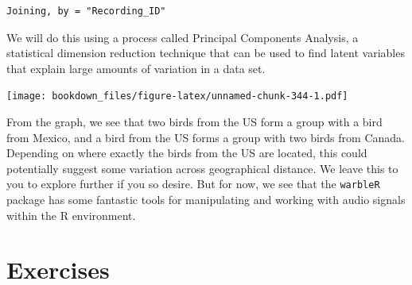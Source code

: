 \documentclass[]{krantz}
\makeatletter
\newenvironment{Shaded}{\begin{snugshade}}{\end{snugshade}}
\newcommand{\KeywordTok}[1]{\textcolor[rgb]{0.27,0.27,0.27}{\textbf{#1}}}
\newcommand{\DataTypeTok}[1]{\textcolor[rgb]{0.27,0.27,0.27}{#1}}
\newcommand{\DecValTok}[1]{\textcolor[rgb]{0.06,0.06,0.06}{#1}}
\newcommand{\StringTok}[1]{\textcolor[rgb]{0.5,0.5,0.5}{#1}}
\newcommand{\CommentTok}[1]{\textcolor[rgb]{0.37,0.37,0.37}{\textit{#1}}}
\newcommand{\OtherTok}[1]{\textcolor[rgb]{0.37,0.37,0.37}{#1}}
\newcommand{\OperatorTok}[1]{\textcolor[rgb]{0.43,0.43,0.43}{\textbf{#1}}}
\newcommand{\ErrorTok}[1]{\textcolor[rgb]{0.14,0.14,0.14}{\textbf{#1}}}
\newcommand{\NormalTok}[1]{#1}
\newenvironment{kframe}{%
\medskip{}
\setlength{\fboxsep}{.8em}
 \def\at@end@of@kframe{}%
 \ifinner\ifhmode%
  \def\at@end@of@kframe{\end{minipage}}%
  \begin{minipage}{\columnwidth}%
 \fi\fi%
 \def\FrameCommand##1{\hskip\@totalleftmargin \hskip-\fboxsep
 \colorbox{shadecolor}{##1}\hskip-\fboxsep
     \hskip-\linewidth \hskip-\@totalleftmargin \hskip\columnwidth}%
 \MakeFramed {\advance\hsize-\width
   \@totalleftmargin\z@ \linewidth\hsize
   \@setminipage}}%
 {\par\unskip\endMakeFramed%
 \at@end@of@kframe}
\renewenvironment{Shaded}{\begin{kframe}}{\end{kframe}}
\makeatother
\begin{document}
\begin{verbatim}
Joining, by = "Recording_ID"
\end{verbatim}

We will do this using a process called Principal Components Analysis, a
statistical dimension reduction technique that can be used to find
latent variables that explain large amounts of variation in a data set.

\begin{Shaded}
\end{Shaded}

\texttt{[image: bookdown\_files/figure-latex/unnamed-chunk-344-1.pdf]}

From the graph, we see that two birds from the US form a group with a
bird from Mexico, and a bird from the US forms a group with two birds
from Canada. Depending on where exactly the birds from the US are
located, this could potentially suggest some variation across
geographical distance. We leave this to you to explore further if you so
desire. But for now, we see that the \texttt{warbleR} package has some
fantastic tools for manipulating and working with audio signals within
the R environment.

\section{Exercises}\label{exercises-11}
\end{document}
